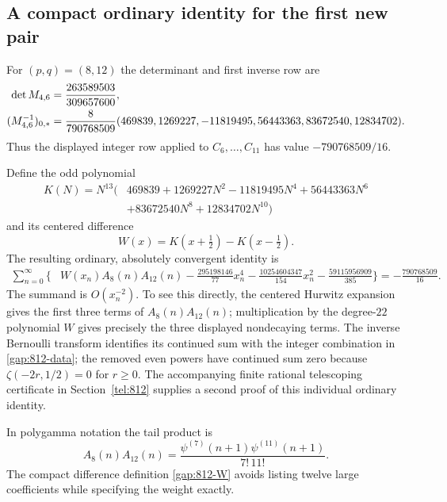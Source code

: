\documentclass[11pt,letterpaper]{article}
\numberwithin{equation}{section}
\theoremstyle{plain}
\theoremstyle{definition}
\theoremstyle{remark}
\begin{document}
\subsection{A compact ordinary identity for the first new pair}

For $(p,q)=(8,12)$ the determinant and first inverse row are
\begin{align}\label{gap:812-data}
 \det M_{4,6}&=\frac{263589503}{309657600},\notag\\
 (M_{4,6}^{-1})_{0,*}
 &=\frac8{790768509}
 (469839,1269227,-11819495,56443363,83672540,12834702).
\end{align}
Thus the displayed integer row applied to $C_6,\ldots,C_{11}$
has value $-790768509/16$.

Define the odd polynomial
\begin{equation}\label{gap:812-K}
 \begin{split}
 K(N)=N^{13}\bigl(&469839+1269227N^2-11819495N^4
                   +56443363N^6\\
                 &+83672540N^8+12834702N^{10}\bigr)
 \end{split}
\end{equation}
and its centered difference
\begin{equation}\label{gap:812-W}
 W(x)=K(x+\tfrac12)-K(x-\tfrac12).
\end{equation}
The resulting ordinary, absolutely convergent identity is
\begin{equation}\label{gap:812-ordinary}
 \begin{split}
 \sum_{n=0}^{\infty}\biggl\{&W(x_n)A_8(n)A_{12}(n)
       -\frac{295198146}{77}x_n^4
       -\frac{10254604347}{154}x_n^2
       -\frac{59115956909}{385}\biggr\}
 =-\frac{790768509}{16}.
 \end{split}
\end{equation}
The summand is $O(x_n^{-2})$. To see this directly, the centered
Hurwitz expansion gives the first three terms of $A_8(n)A_{12}(n)$;
multiplication by the degree-$22$ polynomial $W$ gives precisely
the three displayed nondecaying terms. The inverse Bernoulli
transform identifies its continued sum with the integer combination
in \eqref{gap:812-data}; the removed even powers have continued
sum zero because $\zeta(-2r,1/2)=0$ for $r\ge0$. The accompanying
finite rational telescoping certificate in Section~\ref{tel:812}
supplies a second proof of this individual ordinary identity.

In polygamma notation the tail product is
\[
 A_8(n)A_{12}(n)
   =\frac{\psi^{(7)}(n+1)\psi^{(11)}(n+1)}{7!\,11!}.
\]
The compact difference definition \eqref{gap:812-W} avoids listing
twelve large coefficients while specifying the weight exactly.
\end{document}
